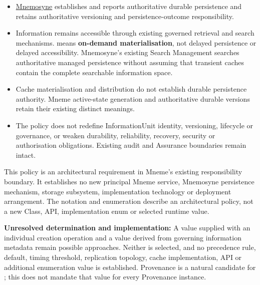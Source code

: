 \begin{itemize}


\item \hyperref[element:7985e647bf9e4ca3ba70faf9e3e4ae02]{Mnemosyne} establishes and reports
  authoritative durable persistence and retains authoritative versioning and
  persistence-outcome responsibility.

\item Information remains accessible through existing governed retrieval and search
  mechanisms. \texttt{} means \textbf{on-demand materialisation}, not delayed
  persistence or delayed accessibility. Mnemosyne's existing Search Management
  searches authoritative managed persistence without assuming that transient
  caches contain the complete searchable information space.

\item Cache materialisation and distribution do not establish durable persistence
  authority. Mneme active-state generation and authoritative durable versions
  retain their existing distinct meanings.

\item The policy does not redefine InformationUnit identity, versioning, lifecycle
  or governance, or weaken durability, reliability, recovery, security or
  authorisation obligations. Existing audit and Assurance boundaries remain intact.

\end{itemize}


This policy is an architectural requirement in Mneme's existing responsibility
boundary. It establishes no new principal Mneme service, Mnemosyne persistence
mechanism, storage subsystem, implementation technology or deployment arrangement.
The notation and enumeration describe an architectural policy, not a new Class,
API, implementation enum or selected runtime value.



\textbf{Unresolved determination and implementation:} A value supplied with an
individual creation operation and a value derived from governing information
metadata remain possible approaches. Neither is selected, and no precedence rule,
default, timing threshold, replication topology, cache implementation, API or
additional enumeration value is established. Provenance is a natural candidate
for \texttt{}; this does not mandate that value for every Provenance instance.



